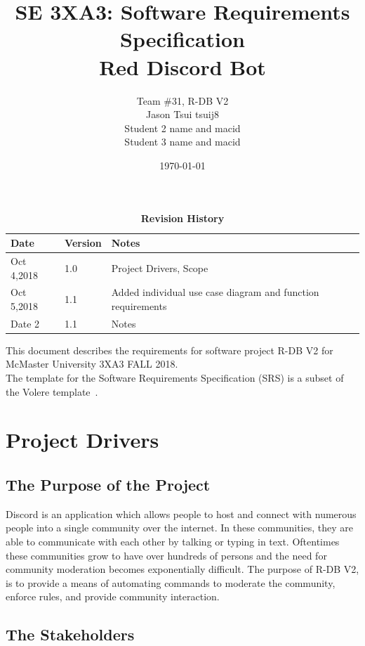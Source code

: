 \documentclass[12pt, titlepage]{article}
\title{SE 3XA3: Software Requirements Specification\\Red Discord Bot}
\author{Team \#31, R-DB V2
		\\ Jason Tsui tsuij8
		\\ Student 2 name and macid
		\\ Student 3 name and macid
}
\date{\today}
\begin{document}
\maketitle

\tableofcontents
\listoftables
\listoffigures

\begin{table}[bp]
\caption{\bf Revision History}
\begin{tabularx}{\textwidth}{p{3cm}p{2cm}X}
\toprule {\bf Date} & {\bf Version} & {\bf Notes}\\
\midrule
Oct 4,2018 & 1.0 & Project Drivers, Scope\\
Oct 5,2018 & 1.1 & Added individual use case diagram and function requirements\\
Date 2 & 1.1 & Notes\\
\bottomrule
\end{tabularx}
\end{table}

\newpage


This document describes the requirements for software project R-DB V2 for McMaster University 3XA3 FALL 2018.\\

The template for the Software
Requirements Specification (SRS) is a subset of the Volere
template~\citep{RobertsonAndRobertson2012}.



\section{Project Drivers}

\subsection{The Purpose of the Project}
Discord is an application which allows people to host and connect with numerous people into a single community over the internet. In these communities, they are able to communicate with each other by talking or typing in text. Oftentimes these communities grow to have over hundreds of persons and the need for community moderation becomes exponentially difficult. The purpose of R-DB V2, is to provide a means of automating commands to moderate the community, enforce rules, and provide community interaction. 

\subsection{The Stakeholders}
\end{document}
